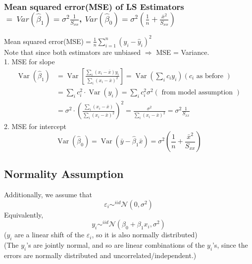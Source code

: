 \documentclass[11pt,a4paper]{article}
\begin{document}
\subsubsection{Mean squared error(MSE) of LS Estimators $=\ Var(\hat{\beta}_1)=\sigma^{2} \frac{1}{S_{x x}}$, $Var(\hat{\beta}_0)=\sigma^{2}\left(\frac{1}{n}+\frac{\bar{x}^{2}}{S_{x x}}\right)$}
Mean squared error(MSE)$= \frac{1}{n}\sum_{i=1}^n(y_i-\hat{y}_i)^2$\\
Note that since both estimators are unbiased $\Rightarrow$ MSE = Variance.\\
1. MSE for slope
\begin{equation}
    \begin{aligned}
        \operatorname{Var}\left(\hat{\beta}_{1}\right) &=\operatorname{Var}\left[\frac{\sum_{i}\left(x_{i}-\bar{x}\right) y_{i}}{\sum_{i}\left(x_{i}-\bar{x}\right)^{2}}\right]=\operatorname{Var}\left(\sum_{i} c_{i} y_{i}\right)\left(c_{i} \text { as before }\right) \\
        &=\sum_{i} c_{i}^{2} \cdot \operatorname{Var}\left(y_{i}\right)=\sum_{i} c_{i}^{2} \sigma^{2}(\text { from model assumption }) \\
        &=\sigma^{2} \cdot\left(\frac{\sum_{i}\left(x_{i}-\bar{x}\right)}{\sum_{i}\left(x_{i}-\bar{x}\right)^{2}}\right)^{2}=\frac{\sigma^{2}}{\sum_{i}\left(x_{i}-\bar{x}\right)^{2}}=\sigma^{2} \frac{1}{S_{x x}}
        \end{aligned}
    \nonumber
\end{equation}
2. MSE for intercept\\
\begin{equation}
    \operatorname{Var}\left(\hat{\beta}_{0}\right)=\operatorname{Var}\left(\bar{y}-\hat{\beta}_{1} \bar{x}\right)=\sigma^{2}\left(\frac{1}{n}+\frac{\bar{x}^{2}}{S_{x x}}\right)
    \nonumber
\end{equation}

\subsection{Normality Assumption}
Additionally, we assume that$$\varepsilon_i\sim^{iid}\mathcal{N}(0,\sigma^2)$$
Equivalently,$$y_i\sim^{iid}\mathcal{N}(\beta_0+\beta_1x_i,\sigma^2)$$
($y_i$ are a linear shift of the $\varepsilon_i$, so it is also normally distributed)\\
(The $y_i$’s are jointly normal, and so are linear combinations of the $y_i$’s, since the errors are normally distributed and uncorrelated/independent.)
\end{document}

